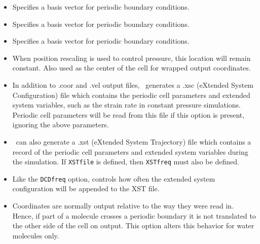 \begin{itemize}

\item
{}
{Specifies a basis vector for periodic boundary conditions.}

\item
{}
{Specifies a basis vector for periodic boundary conditions.}

\item
{}
{Specifies a basis vector for periodic boundary conditions.}

\item
{}
{When position rescaling is used to control pressure, this location will remain constant.  Also used as the center of the cell for wrapped output coordinates.}

\item
{}
{In addition to .coor and .vel output files, \PDAC\ generates a .xsc (eXtended System Configuration) file which contains the periodic cell parameters and extended system variables, such as the strain rate in constant pressure simulations.  Periodic cell parameters will be read from this file if this option is present, ignoring the above parameters.}

\item
{}
{\PDAC\ can also generate a .xst (eXtended System Trajectory) file which contains a record of the periodic cell parameters and extended system variables during the simulation.  If {\tt XSTfile} is defined, then {\tt XSTfreq} must also be defined.}

\item
{}
{Like the {\tt DCDfreq} option, controls how often the extended system configuration will be appended to the XST file.}

\item
{}
{Coordinates are normally output relative to the way they were read in.  Hence, if part of a molecule crosses a periodic boundary it is not translated to the other side of the cell on output.  This option alters this behavior for water molecules only.}


\end{itemize}

